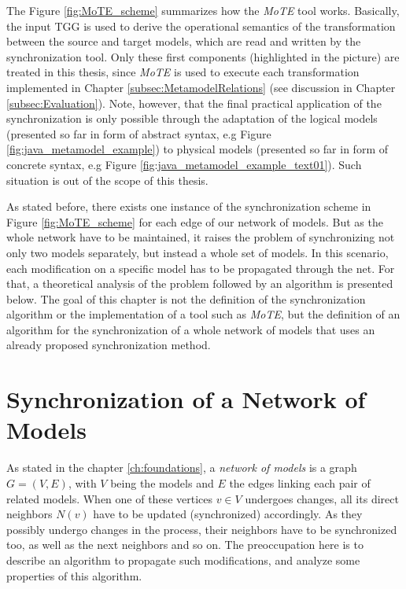 \documentclass[tuberlin,cic,tc,english,noabntcite]{iiufrgs}
\begin{document}
The Figure \ref{fig:MoTE_scheme} summarizes how the \emph{MoTE} tool works. Basically, the input TGG is used to derive the operational semantics of the transformation between the source and target models, which are read and written by the synchronization tool. Only these first components (highlighted in the picture) are treated in this thesis, since \emph{MoTE} is used to execute each transformation implemented in Chapter \ref{subsec:MetamodelRelations} (see discussion in Chapter \ref{subsec:Evaluation}). Note, however, that the final practical application of the synchronization is only possible through the adaptation of the logical models (presented so far in form of abstract syntax, e.g Figure \ref{fig:java_metamodel_example}) to physical models (presented so far in form of concrete syntax, e.g Figure \ref{fig:java_metamodel_example_text01}). Such situation is out of the scope of this thesis. 

As stated before, there exists one instance of the synchronization scheme in Figure \ref{fig:MoTE_scheme} for each edge of our network of models. But as the whole network have to be maintained, it raises the problem of synchronizing not only two models separately, but instead a whole set of models. In this scenario, each modification on a specific model has to be propagated through the net. For that, a theoretical analysis of the problem followed by an algorithm is presented below. The goal of this chapter is not the definition of the synchronization algorithm or the implementation of a tool such as \emph{MoTE}, but the definition of an algorithm for the synchronization of a whole network of models that uses an already proposed synchronization method.

\section{Synchronization of a Network of Models}
As stated in the chapter \ref{ch:foundations}, a \emph{network of models} is a graph $G = (V,E)$, with $V$ being the models and $E$ the edges linking each pair of related models. When one of these vertices $v \in V$ undergoes changes, all its direct neighbors $N(v)$ have to be updated (synchronized) accordingly. As they possibly undergo changes in the process, their neighbors have to be synchronized too, as well as the next neighbors and so on. The preoccupation here is to describe an algorithm to propagate such modifications, and analyze some properties of this algorithm.
\end{document}
